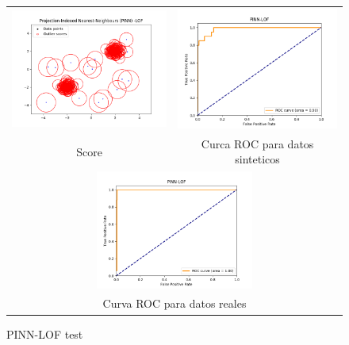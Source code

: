 \begin{figure}[H]
    \begin{tabular}{cc}
      \includegraphics[width=65mm,height=40mm]{imagenes/pinn-lof-sintetico.png} &   \includegraphics[width=65mm,height=40mm]{imagenes/pinn-lof-sintetic-roc.png} \\
    Score & Curca ROC para datos sinteticos \\[6pt]
    \multicolumn{2}{c}{\includegraphics[width=65mm,height=39mm]{imagenes/pinn-lof-test.png} }\\
    \multicolumn{2}{c}{Curva ROC para datos reales}\\
    \end{tabular}
    \caption{\label{fig:pinnloftest} PINN-LOF test}
\end{figure}


